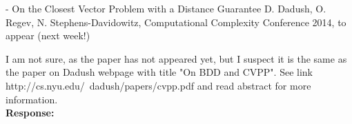 \documentclass[a4paper,10pt]{article}
\begin{document}
\begin{enumerate}
- On the Closest Vector Problem with a Distance Guarantee 
D. Dadush, O. Regev, N. Stephens-Davidowitz, Computational Complexity Conference 2014, to appear (next week!) 

I am not sure, as the paper has not appeared yet, but I suspect it is the same as the paper on Dadush webpage with title "On BDD and CVPP". 
See link 
http://cs.nyu.edu/~dadush/papers/cvpp.pdf 
and read abstract for more information.
\\\textbf{Response:}

\end{enumerate}





\end{document}

